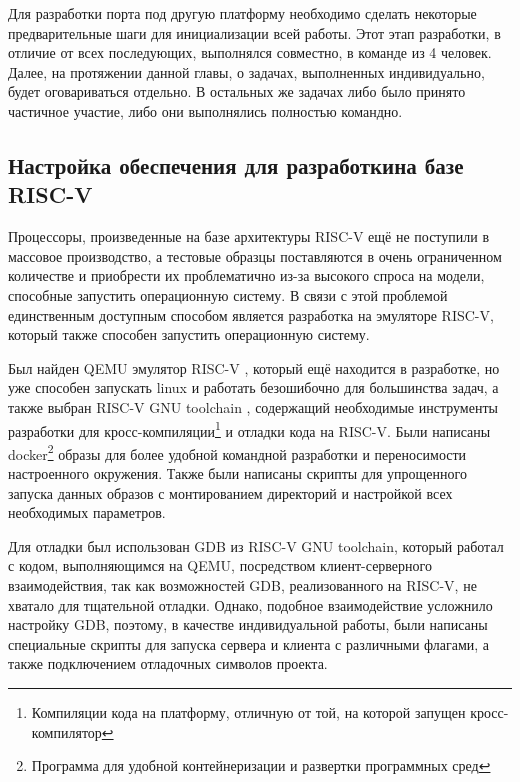 \newpage
{}

Для разработки порта под другую платформу необходимо сделать некоторые предварительные шаги для инициализации всей работы. Этот этап разработки, в отличие от всех последующих, выполнялся совместно, в команде из 4 человек. 
Далее, на протяжении данной главы, о задачах, выполненных индивидуально, будет оговариваться отдельно. В остальных же задачах либо было принято частичное участие, либо они выполнялись полностью командно.

\subsection[Настройка обеспечения для разработки на базе RISC-V]{Настройка обеспечения для разработки\newline на базе RISC-V}

Процессоры, произведенные на базе архитектуры RISC-V ещё не поступили в массовое производство, а тестовые образцы поставляются в очень ограниченном количестве и приобрести их проблематично \cite{sifive} из-за высокого спроса на модели, способные запустить операционную систему. В связи с этой проблемой единственным доступным способом является разработка на эмуляторе RISC-V, который также способен запустить операционную систему.

Был найден QEMU эмулятор RISC-V \cite{riscv:qemu}, который ещё находится в разработке, но уже способен запускать linux и работать безошибочно для большинства задач, а также выбран RISC-V GNU toolchain \cite{riscv:gnu}, содержащий необходимые инструменты разработки для кросс-компиляции\footnote{Компиляции кода на платформу, отличную от той, на которой запущен кросс-компилятор} и отладки \cpp кода на RISC-V. Были написаны docker\footnote{Программа для удобной контейнеризации и развертки программных сред} образы для более удобной командной разработки и переносимости настроенного окружения. Также были написаны скрипты для упрощенного запуска данных образов с монтированием директорий и настройкой всех необходимых параметров.

Для отладки был использован GDB из RISC-V GNU toolchain, который работал с кодом, выполняющимся на QEMU, посредством клиент-серверного взаимодействия, так как возможностей GDB, реализованного на RISC-V, не хватало для тщательной отладки. Однако, подобное взаимодействие усложнило настройку GDB, поэтому, в качестве индивидуальной работы, были написаны специальные скрипты для запуска сервера и клиента с различными флагами, а также подключением отладочных символов проекта.



